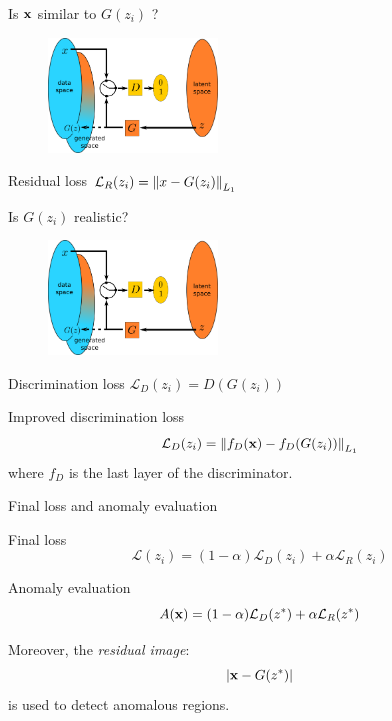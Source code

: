 \documentclass[xcolor=pdftex,dvipsnames,table,mathserif,aspectratio=169]{beamer}
\begin{document}
\begin{frame}{Is $\mathbf{x}$ similar to $G(z_i)$ ?}

  \begin{figure}[ht]
    \centering
    \includegraphics[width=0.4\textwidth]{gan2}
  \end{figure}

  \begin{block}{Residual loss}
    \centering
    $\mathcal{L}_R(z_i) = \norm{x - G(z_i)}_{L_1}$
  \end{block}

\end{frame}


\begin{frame}{Is $G(z_i)$ realistic?}

  \begin{figure}[ht]
    \centering
    \includegraphics[width=0.4\textwidth]{gan2}
  \end{figure}

  \begin{block}{Discrimination loss}
    \centering
    $\mathcal{L}_D(z_i) = D(G(z_i))$
  \end{block}

  \begin{block}{Improved discrimination loss}
    \[\mathcal{L}_D(z_i) = \norm{f_D(\mathbf{x}) - f_D(G(z_i))}_{L_1}\]
    where $f_D$ is the last layer of the discriminator.
  \end{block}


\end{frame}


\begin{frame}{Final loss and anomaly evaluation}

  \begin{block}{Final loss}
    \[\mathcal{L}(z_i) = (1-\alpha)\mathcal{L}_D(z_i) + \alpha \mathcal{L}_R(z_i) \]
  \end{block}

  \begin{block}{Anomaly evaluation}
    \[A(\mathbf{x}) = (1-\alpha)\mathcal{L}_D(z^*) + \alpha \mathcal{L}_R(z^*) \]

      Moreover, the \emph{residual image}:
      \[
      |\mathbf{x} - G(z^*)|
      \]
      is used to detect anomalous regions.
  \end{block}

\end{frame}
\end{document}
